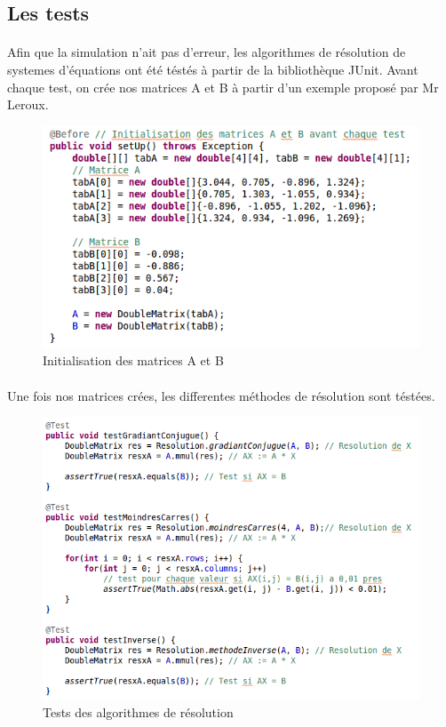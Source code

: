 \documentclass[a4paper,11pt]{article}
\begin{document}
		\newpage

		\subsection{Les tests}
		\paragraph{}
		Afin que la simulation n'ait pas d'erreur, les algorithmes de résolution de systemes d'équations ont été téstés à partir de la bibliothèque JUnit.
		Avant chaque test, on crée nos matrices A et B à partir d'un exemple proposé par Mr Leroux.

		\begin{figure}[h]
			\centerline{\includegraphics[scale=0.50]{img/testInit.png}}
			\caption{Initialisation des matrices A et B}
			\label{diagramme-composants}
		\end{figure} 

		\paragraph{}
		Une fois nos matrices crées, les differentes méthodes de résolution sont téstées.

		\begin{figure}[h]
			\centerline{\includegraphics[scale=0.50]{img/testResol.png}}
			\caption{Tests des algorithmes de résolution}
			\label{diagramme-composants}
		\end{figure} 
\end{document}
